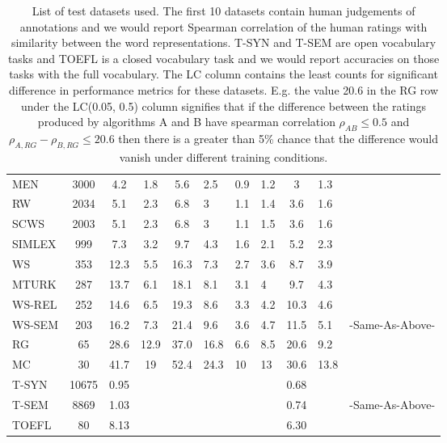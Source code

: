 \documentclass[11pt]{article}
\begin{document}
\begin{table*}[ht]
{\begin{tabular}{l c c c c H H H c H l}
    MEN    & 3000  & 4.2  & 1.8  & 5.6  & 2.5  & 0.9 & 1.2 & 3    & 1.3  & \cite{bruni2012distributional}  \\
    RW     & 2034  & 5.1  & 2.3  & 6.8  & 3    & 1.1 & 1.4 & 3.6  & 1.6  & \cite{Luong2013morpho}          \\
    SCWS   & 2003  & 5.1  & 2.3  & 6.8  & 3    & 1.1 & 1.5 & 3.6  & 1.6  & \cite{Huang2012Improving}       \\
    SIMLEX & 999   & 7.3  & 3.2  & 9.7  & 4.3  & 1.6 & 2.1 & 5.2  & 2.3  & \cite{hill2014simlex}           \\
    WS     & 353   & 12.3 & 5.5  & 16.3 & 7.3  & 2.7 & 3.6 & 8.7  & 3.9  & \cite{finkelstein2001placing}   \\
    MTURK  & 287   & 13.7 & 6.1  & 18.1 & 8.1  & 3.1 & 4   & 9.7  & 4.3  & \cite{Radinsky2011word}         \\
    WS-REL & 252   & 14.6 & 6.5  & 19.3 & 8.6  & 3.3 & 4.2 & 10.3 & 4.6  & \cite{agirre2009study}          \\
    WS-SEM & 203   & 16.2 & 7.3  & 21.4 & 9.6  & 3.6 & 4.7 & 11.5 & 5.1  & -Same-As-Above-                 \\
    RG     & 65    & 28.6 & 12.9 & 37.0 & 16.8 & 6.6 & 8.5 & 20.6 & 9.2  & \cite{Rubenstein1965Contextual} \\
    MC     & 30    & 41.7 & 19   & 52.4 & 24.3 & 10  & 13  & 30.6 & 13.8 & \cite{miller1991contextual}     \\ \hline
    T-SYN  & 10675 & 0.95 &      &      &      &     &     & 0.68 &      & \cite{mikolov2013distributed}   \\
    T-SEM  & 8869  & 1.03 &      &      &      &     &     & 0.74 &      & -Same-As-Above-                 \\ \hline
    TOEFL  & 80    & 8.13 &      &      &      &     &     & 6.30 &      & \cite{landauer1997solution}
  \end{tabular}
  }
  \caption{List of test datasets used. The first 10 datasets contain human
    judgements of annotations and we would report Spearman correlation
    of  the human ratings with similarity between the word
    representations.
    T-SYN and T-SEM are open vocabulary tasks and TOEFL is a closed
    vocabulary task and we would report accuracies on
  those tasks with the full vocabulary. The LC column contains the
  least counts for significant difference in performance metrics for
  these datasets. E.g. the value 20.6 in the RG row under the
  LC(0.05, 0.5) column signifies that if the difference between the
  ratings produced by algorithms A and B have spearman correlation
  $\rho_{AB} \le 0.5$ and $\rho_{A,RG} - \rho_{B,RG} \le 20.6$ then there is a
  greater than 5\% chance that the difference would vanish under
  different training conditions.}
\end{table*}
\end{document}
